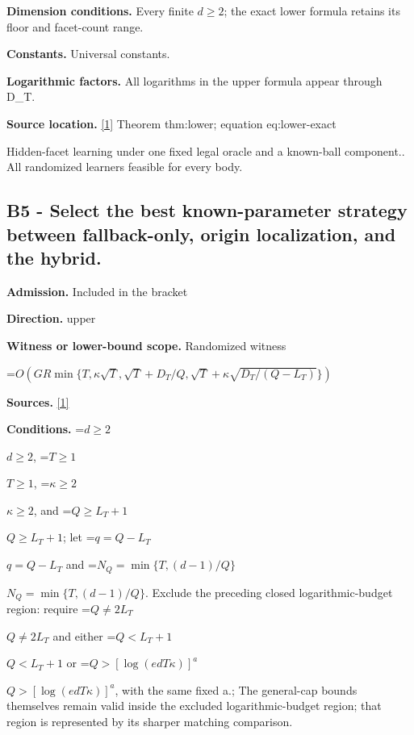 \documentclass[10pt,a4paper]{article}
\newcommand{\AtlasMath}[1]{\par\begingroup\centering\setbox0=\hbox{$\displaystyle #1$}\ifdim\wd0>1.4\linewidth\typeout{ATLAS WIDE FORMULA: \the\wd0}\fi\ifdim\wd0>\linewidth\resizebox{\linewidth}{!}{\box0}\else\box0\fi\par\endgroup}
\newcommand{\AtlasInlineMath}[1]{\begingroup\setbox0=\hbox{$#1$}\ifdim\wd0>.4\linewidth\endgroup\AtlasMath{#1}\else\endgroup$#1$\fi}
\begin{document}
\textbf{Dimension conditions.} Every finite $d\ge 2$; the exact lower formula retains its floor and facet-count range.



\textbf{Constants.} Universal constants.



\textbf{Logarithmic factors.} All logarithms in the upper formula appear through D\_T.



\textbf{Source location.} \href{https://github.com/WU-Wendao/Colombo/blob/main/colombo_sensorium/Complexity_altas/data/sources/colombo/U08/manuscript.pdf}{[1]} Theorem thm:lower; equation eq:lower-exact



Hidden-facet learning under one fixed legal oracle and a known-ball component.. All randomized learners feasible for every body.



\subsection{B5 - Select the best known-parameter strategy between fallback-only, origin localization, and the hybrid.}


\textbf{Admission.} Included in the bracket



\textbf{Direction.} upper



\textbf{Witness or lower-bound scope.} Randomized witness



\AtlasMath{O\!\left(GR\min\{T,\kappa\sqrt T,\sqrt T+D_T/Q,\sqrt T+\kappa\sqrt{D_T/(Q-L_T)}\}\right)}


\textbf{Sources.} \href{https://github.com/WU-Wendao/Colombo/blob/main/colombo_sensorium/Complexity_altas/data/sources/colombo/U08/manuscript.pdf}{[1]}



\textbf{Conditions.} \AtlasInlineMath{d\ge2}, \AtlasInlineMath{T\ge1}, \AtlasInlineMath{\kappa\ge2}, and \AtlasInlineMath{Q\ge L_T+1}; let \AtlasInlineMath{q=Q-L_T} and \AtlasInlineMath{N_Q=\min\{T,(d-1)/Q\}}. Exclude the preceding closed logarithmic-budget region: require \AtlasInlineMath{Q\ne2L_T} and either \AtlasInlineMath{Q<L_T+1} or \AtlasInlineMath{Q>[\log(edT\kappa)]^a}, with the same fixed a.; The general-cap bounds themselves remain valid inside the excluded logarithmic-budget region; that region is represented by its sharper matching comparison.
\end{document}

